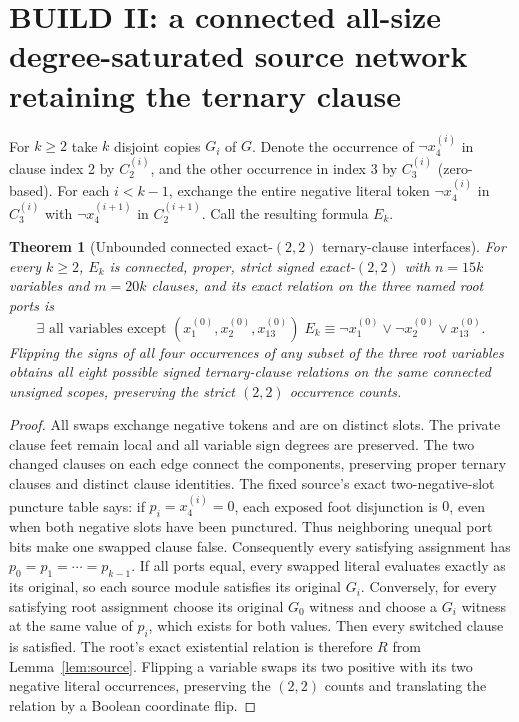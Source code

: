 \documentclass[11pt]{article}
\newtheorem{theorem}{Theorem}
\begin{document}
\section{BUILD II: a connected all-size degree-saturated source network retaining the ternary clause}
For $k\ge2$ take $k$ disjoint copies $G_i$ of $G$. Denote the occurrence of $\neg x_4^{(i)}$ in clause index 2 by $C_2^{(i)}$, and the other occurrence in index 3 by $C_3^{(i)}$ (zero-based). For each $i<k-1$, exchange the entire negative literal token $\neg x_4^{(i)}$ in $C_3^{(i)}$ with $\neg x_4^{(i+1)}$ in $C_2^{(i+1)}$. Call the resulting formula $E_k$.
\begin{theorem}[Unbounded connected exact-$(2,2)$ ternary-clause interfaces]\label{thm:chain}
For every $k\ge2$, $E_k$ is connected, proper, strict signed exact-$(2,2)$ with $n=15k$ variables and $m=20k$ clauses, and its exact relation on the three named root ports is
\[
\boxed{\exists\text{ all variables except }(x_1^{(0)},x_2^{(0)},x_{13}^{(0)})\; E_k
\equiv\neg x_1^{(0)}\vee\neg x_2^{(0)}\vee x_{13}^{(0)}.}
\]
Flipping the signs of all four occurrences of any subset of the three root variables obtains all eight possible signed ternary-clause relations on the same connected unsigned scopes, preserving the strict $(2,2)$ occurrence counts.
\end{theorem}
\begin{proof}
All swaps exchange negative tokens and are on distinct slots. The private clause feet remain local and all variable sign degrees are preserved. The two changed clauses on each edge connect the components, preserving proper ternary clauses and distinct clause identities. The fixed source's exact two-negative-slot puncture table says: if $p_i=x_4^{(i)}=0$, each exposed foot disjunction is $0$, even when both negative slots have been punctured. Thus neighboring unequal port bits make one swapped clause false. Consequently every satisfying assignment has $p_0=p_1=\cdots=p_{k-1}$. If all ports equal, every swapped literal evaluates exactly as its original, so each source module satisfies its original $G_i$. Conversely, for every satisfying root assignment choose its original $G_0$ witness and choose a $G_i$ witness at the same value of $p_i$, which exists for both values. Then every switched clause is satisfied. The root's exact existential relation is therefore $R$ from Lemma~\ref{lem:source}. Flipping a variable swaps its two positive with its two negative literal occurrences, preserving the $(2,2)$ counts and translating the relation by a Boolean coordinate flip.
\end{proof}
\end{document}

